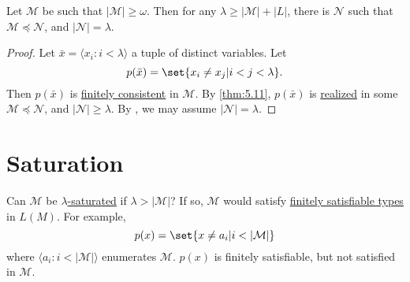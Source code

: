 \documentclass{article}
\newcommand{\named}[1]{\textbf{#1}\index{#1}}
\begin{document}
\begin{nthm}\label{thm:5.12}
  Let $\mathcal{M}$ be such that $|\mathcal{M}| \geq \omega$.
  Then for any $\lambda \geq |\mathcal{M}| + |L|$, there is $\mathcal{N}$ such that \hyperlink{def:elsubs}{$\mathcal{M} \preccurlyeq \mathcal{N}$}, and $|\mathcal{N}| = \lambda$.
\end{nthm}
\begin{proof}
  Let $\bar{x} = \langle x_i : i < \lambda \rangle$ a tuple of distinct variables.
  Let
  \begin{equation*}
    p(\bar{x}) = \set{x_i \neq x_j | i < j < \lambda}.
  \end{equation*}
  Then $p(\bar{x})$ is \hyperlink{def:type}{finitely consistent} in $\mathcal{M}$.
  By \cref{thm:5.11}, $p(\bar{x})$ is \hyperlink{def:type}{realized} in some $\mathcal{M} \preccurlyeq \mathcal{N}$, and $|\mathcal{N}| \geq \lambda$.
  By , we may assume $|\mathcal{N}| = \lambda$.
\end{proof}

\clearpage
\section{Saturation}

Can $\mathcal{M}$ be \hyperlink{def:sat}{$\lambda$-saturated} if $\lambda > |\mathcal{M}|$? If so, $\mathcal{M}$ would satisfy \hyperlink{def:type}{finitely satisfiable types} in $L(M)$.
For example,
\begin{equation*}
    p(x) = \set{x \neq a_i | i < |\mathcal{M}|}
\end{equation*}
where $\langle a_i : i < |\mathcal{M}| \rangle$ enumerates $\mathcal{M}$. $p(x)$ is finitely satisfiable, but not satisfied in $\mathcal{M}$.
\end{document}
